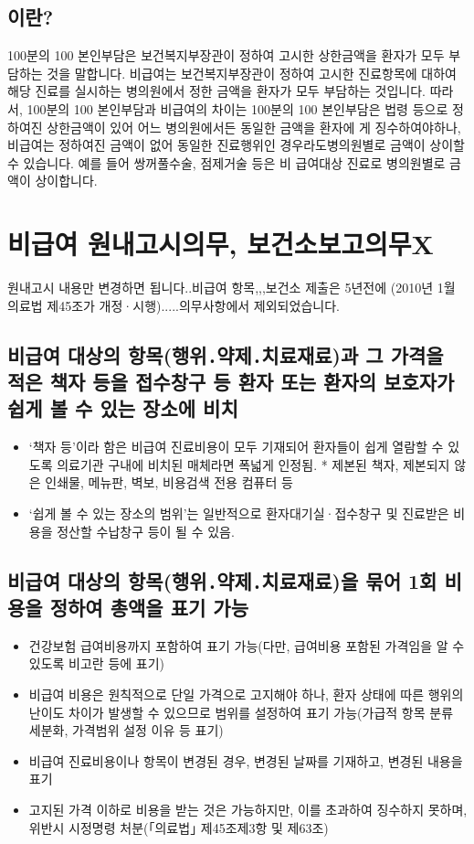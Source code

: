 \subsection{이란?}
100분의 100 본인부담은 보건복지부장관이 정하여 고시한 상한금액을 환자가 모두 부담하는 것을 말합니다. 
비급여는 보건복지부장관이 정하여 고시한 진료항목에 대하여 해당 진료를 실시하는 병의원에서 정한 금액을 환자가 모두 부담하는 것입니다.
따라서, 100분의 100 본인부담과 비급여의 차이는 100분의 100 본인부담은 법령 등으로 정하여진 상한금액이 있어 어느 병\cntrdot{}의원에서든 동일한 금액을 환자에
게 징수하여야하나, 비급여는 정하여진 금액이 없어 동일한 진료행위인 경우라도병\cntrdot{}의원별로 금액이 상이할 수 있습니다. 예를 들어 쌍꺼풀수술, 점제거술 등은 비
급여대상 진료로 병\cntrdot{}의원별로 금액이 상이합니다.
 

\section{비급여 원내고시의무, 보건소보고의무X}
원내고시 내용만 변경하면 됩니다..비급여 항목,,,보건소 제출은 5년전에 (2010년 1월 의료법 제45조가 개정·시행).....의무사항에서 제외되었습니다.

\subsection{비급여 대상의 항목(행위․약제․치료재료)과 그 가격을 적은 책자 등을 접수창구 등 환자 또는 환자의 보호자가 쉽게 볼 수 있는 장소에 비치}
\begin{itemize}\tightlist
\item `책자 등'이라 함은 비급여 진료비용이 모두 기재되어 환자들이 쉽게 열람할 수 있도록 의료기관 구내에 비치된 매체라면 폭넓게 인정됨. 
     * 제본된 책자, 제본되지 않은 인쇄물, 메뉴판, 벽보, 비용검색 전용 컴퓨터 등
\item `쉽게 볼 수 있는 장소의 범위'는 일반적으로 환자대기실·접수창구 및 진료받은 비용을 정산할 수납창구 등이 될 수 있음.
\end{itemize}

\subsection{비급여 대상의 항목(행위․약제․치료재료)을 묶어 1회 비용을 정하여 총액을 표기 가능}
\begin{itemize}\tightlist
\item 건강보험 급여비용까지 포함하여 표기 가능(다만, 급여비용 포함된 가격임을 알 수 있도록 비고란 등에 표기)
\item 비급여 비용은 원칙적으로 단일 가격으로 고지해야 하나, 환자 상태에 따른 행위의 난이도 차이가 발생할 수 있으므로 범위를 설정하여 표기 가능(가급적 항목 분류 세분화, 가격범위 설정 이유 등 표기)
\item 비급여 진료비용이나 항목이 변경된 경우, 변경된 날짜를 기재하고, 변경된 내용을 표기
\item 고지된 가격 이하로 비용을 받는 것은 가능하지만, 이를 초과하여 징수하지 못하며, 위반시 시정명령 처분(｢의료법｣ 제45조제3항 및 제63조)
\end{itemize}
\clearpage

